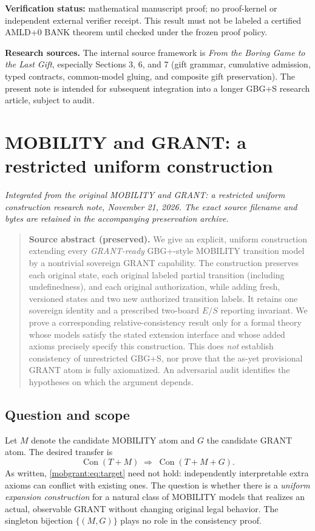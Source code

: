 \documentclass[11pt,letterpaper]{article}
\theoremstyle{definition}\newtheorem{definition}[theorem]{Definition}\newtheorem{example}[theorem]{Example}
\theoremstyle{remark}\newtheorem{remark}[theorem]{Remark}
\newcommand{\Con}{\operatorname{Con}}
\begin{document}
\medskip\noindent\textbf{Verification status:} mathematical manuscript proof; no proof-kernel or independent external verifier receipt. This result must not be labeled a certified AMLD+0 BANK theorem until checked under the frozen proof policy.

\vspace{1.3em}\noindent\textbf{Research sources.} The internal source framework is \emph{From the Boring Game to the Last Gift}, especially Sections 3, 6, and 7 (gift grammar, cumulative admission, typed contracts, common-model gluing, and composite gift preservation). The present note is intended for subsequent integration into a longer GBG+S research article, subject to audit.



\section{MOBILITY and GRANT: a restricted uniform construction}\label{br:sec:mobgrant}
\noindent\textit{Integrated from the original MOBILITY and GRANT: a restricted uniform construction research note, November 21, 2026. The exact source filename and bytes are retained in the accompanying preservation archive.}

\begin{quote}\small\textbf{Source abstract (preserved).} We give an explicit, uniform construction extending every \emph{GRANT-ready} GBG+-style MOBILITY transition model by a nontrivial sovereign GRANT capability. The construction preserves each original state, each original labeled partial transition (including undefinedness), and each original authorization, while adding fresh, versioned states and two new authorized transition labels. It retains one sovereign identity and a prescribed two-board $E/S$ reporting invariant. We prove a corresponding relative-consistency result only for a formal theory whose models satisfy the stated extension interface and whose added axioms precisely specify this construction. This does \emph{not} establish consistency of unrestricted GBG+S, nor prove that the as-yet provisional GRANT atom is fully axiomatized. An adversarial audit identifies the hypotheses on which the argument depends.\end{quote}





\subsection{Question and scope}
Let $M$ denote the candidate MOBILITY atom and $G$ the candidate GRANT atom. The desired transfer is
\begin{equation}\label{mobgrant:eq:target}
\Con(T+M)\;\Longrightarrow\;\Con(T+M+G).
\end{equation}
As written, \eqref{mobgrant:eq:target} need not hold: independently interpretable extra axioms can conflict with existing ones. The question is whether there is a \emph{uniform expansion construction} for a natural class of MOBILITY models that realizes an actual, observable GRANT without changing original legal behavior. The singleton bijection $\{(M,G)\}$ plays no role in the consistency proof.
\end{document}
